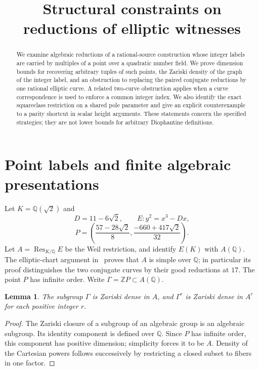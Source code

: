 \documentclass[11pt,a4paper]{article}
\title{Structural constraints on reductions of elliptic witnesses}
\author{}\date{}
\newtheorem{lemma}[theorem]{Lemma}
\theoremstyle{remark}\newtheorem{remark}[theorem]{Remark}
\newcommand{\Q}{\mathbb Q}\newcommand{\Z}{\mathbb Z}
\DeclareMathOperator{\Res}{Res}
\begin{document}
\maketitle
\begin{abstract}
We examine algebraic reductions of a rational-source construction
whose integer labels are carried by multiples of a point over a
quadratic number field.  We prove dimension bounds for recovering
arbitrary tuples of such points, the Zariski density of the graph
of the integer label, and an obstruction to replacing the paired
conjugate reductions by one rational elliptic curve.  A related
two-curve obstruction applies when a curve correspondence is used
to enforce a common integer index.  We also identify the exact
squareclass restriction on a shared pole parameter and give an
explicit counterexample to a parity shortcut in scalar height
arguments.  These statements concern the specified strategies;
they are not lower bounds for arbitrary Diophantine definitions.
\end{abstract}

\section{Point labels and finite algebraic presentations}

Let $K=\Q(\sqrt2)$ and
\[
 D=11-6\sqrt2,\qquad E:y^2=x^3-Dx,
\]
\[
 P=\left(\frac{57-28\sqrt2}{8},
                \frac{-660+417\sqrt2}{32}\right).
\]
Let $A=\Res_{K/\Q}E$ be the Weil restriction, and identify
$E(K)$ with $A(\Q)$.  The elliptic-chart argument in~\cite{Charts}
proves that $A$ is simple over $\Q$; in particular its proof
distinguishes the two conjugate curves by their good reductions
at $17$.  The point $P$ has infinite order.  Write
$\Gamma=\Z P\subset A(\Q)$.

\begin{lemma}\label{lem:dense}
The subgroup $\Gamma$ is Zariski dense in $A$, and
$\Gamma^r$ is Zariski dense in $A^r$ for each positive integer $r$.
\end{lemma}
\begin{proof}
The Zariski closure of a subgroup of an algebraic group is an
algebraic subgroup.  Its identity component is defined over $\Q$.
Since $P$ has infinite order, this component has positive dimension;
simplicity forces it to be $A$.  Density of the Cartesian powers
follows successively by restricting a closed subset to fibers in
one factor.
\end{proof}
\end{document}
